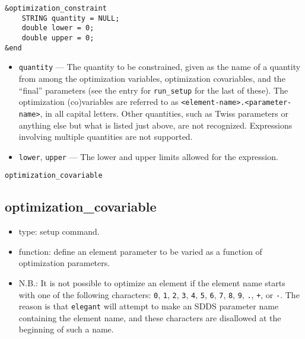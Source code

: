 \documentclass[11pt]{article}
\begin{document}
\begin{verbatim}
&optimization_constraint
    STRING quantity = NULL;
    double lower = 0;
    double upper = 0;
&end
\end{verbatim}

\begin{itemize}

\item \verb|quantity| --- The quantity to be constrained, given as the
name of a quantity from among the optimization variables, optimization
covariables, and the ``final'' parameters (see the entry for
\verb|run_setup| for the last of these).  The optimization
(co)variables are referred to as
\verb|<element-name>.<parameter-name>|, in all capital letters.  Other
quantities, such as Twiss parameters or anything else but what is
listed just above, are not recognized.  Expressions involving multiple
quantities are not supported.

\item \verb|lower|, \verb|upper| --- The lower and upper limits
allowed for the expression.

\end{itemize}

\begin{latexonly}
\newpage
\begin{center}{\Large\verb|optimization_covariable|}\end{center}
\end{latexonly}
\subsection{optimization\_covariable \label{subsec:optimizationcovariable}}

\begin{itemize}
\item type: setup command.
\item function: define an element parameter to be varied as a function of optimization parameters.
\item N.B.: It is not possible to optimize an element if the element name starts with one of the following
characters: 
\verb|0|, \verb|1|, \verb|2|, \verb|3|, \verb|4|, \verb|5|, \verb|6|, \verb|7|, \verb|8|,
\verb|9|, \verb|.|, \verb|+|, or \verb|-|.  The reason is that {\tt elegant} will attempt to 
make an SDDS parameter name containing the element name, and these characters are disallowed
at the beginning of such a name.
\end{itemize}
\end{document}
